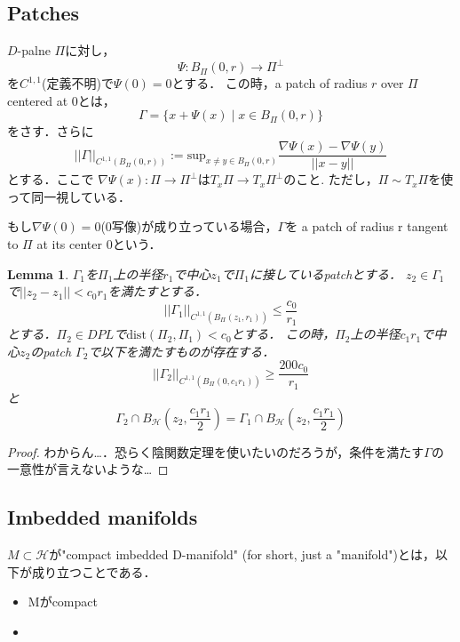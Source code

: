 \documentclass{ujarticle}
\newtheorem{lem}[thm]{Lemma}
\newcommand{\bh}[2]{B_{\mathcal{H}}(#1,#2)}
\newcommand{\bpd}{B_{\Pi}(0,r)}
\newcommand{\bp}[3]{B_{\Pi_{#3}}(#1,#2)}
\newcommand{\gn}[4]{||\Gamma_{#1}||_{C^{1,1}(\bp{#2}{#3}{#4})}}
\newcommand{\gnaaad}{||\Gamma_1||_{C^{1,1}(\bp{z_1}{r_1}{})}}
\newcommand{\gnd}{||\Gamma||_{C^{1,1}(\bpd)}}
\begin{document}
\subsection{Patches}
\label{sub:Patches}
$D$-palne $\Pi$に対し，
\begin{equation*}
 \Psi :\bpd \to \Pi^{\perp}
\end{equation*}
を$C^{1,1}$(定義不明)で$\Psi(0)=0$とする．
この時，a patch of radius $r$ over $\Pi$ centered at 0とは，
\begin{equation*}
 \Gamma=\{ x + \Psi(x) \mid x \in \bpd \}
\end{equation*}
をさす．さらに
\begin{equation*}
 \gnd := \mathrm{sup}_{x \neq y \in \bpd} \frac{ \nabla \Psi(x) - \nabla \Psi(y)}{||x - y||}
\end{equation*}
とする．ここで
$\nabla\Psi(x):\Pi \to \Pi^{\perp}$は$T_x\Pi \to T_x\Pi^{\perp}$のこと.
ただし，$\Pi \sim T_x \Pi$を使って同一視している．

もし$ \nabla \Psi(0)=0$(0写像)が成り立っている場合，$\Gamma$を
a patch of radius r tangent to $\Pi$ at its center 0という．

\begin{lem}
  $\Gamma_1$を$\Pi_1$上の半径$r_1$で中心$z_1$で$\Pi_1$に接しているpatchとする．
  $z_2 \in \Gamma_1$で$||z_2 -z_1 || < c_0r_1$を満たすとする．
  \begin{equation*}
   \gnaaad \le \frac{c_0}{r_1}
  \end{equation*}
  とする．$\Pi_2 \in DPL$で$\mathrm{dist}(\Pi_2,\Pi_1) <c_0$とする．
  この時，$\Pi_2$上の半径$c_1r_1$で中心$z_2$のpatch $\Gamma_2$で以下を満たすものが存在する．
  \begin{equation*}
   \gn{2}{0}{c_1r_1}{} \ge \frac{200c_0}{r_1}
  \end{equation*}
と
\begin{equation*}
\Gamma_2 \cap \bh{z_2}{\frac{c_1r_1}{2}} = \Gamma_1 \cap \bh{z_2}{\frac{c_1r_1}{2}}
\end{equation*}
\end{lem}

\begin{proof}
 わからん…．恐らく陰関数定理を使いたいのだろうが，条件を満たす$\Gamma$の一意性が言えないような…
\end{proof}

\subsection{Imbedded manifolds}
\label{sub:Imbedded manifolds}
$M \subset \mathcal{H}$が"compact imbedded D-manifold" (for short, just a "manifold")とは，以下が成り立つことである．
\begin{itemize}
  \item Mがcompact
  \item
\end{itemize}
\end{document}
